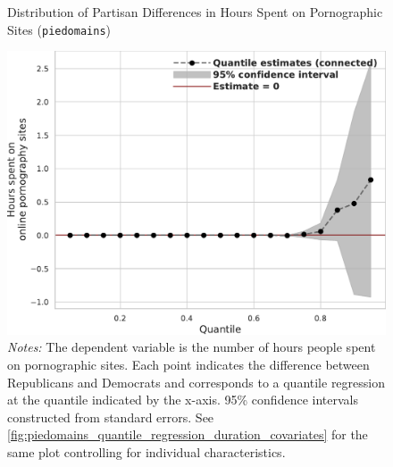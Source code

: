 \documentclass[12pt,twoside]{article}
\begin{document}
\begin{figure}[ht]
	\centering
	\caption{Distribution of Partisan Differences in Hours Spent on Pornographic Sites (\texttt{piedomains})}
	\includegraphics[width=.7\linewidth]{figs/piedomains_quantile_reg_duration_adult.pdf}
	\caption*{\footnotesize \emph{Notes:} 
		The dependent variable is the number of hours people spent on pornographic sites. Each point indicates the difference between Republicans and Democrats and corresponds to a quantile regression at the quantile indicated by the x-axis. 95\% confidence intervals constructed from standard errors. See \cref{fig:piedomains_quantile_regression_duration_covariates} for the same plot controlling for individual characteristics.
	}
	\label{fig:piedomains_quantile_regression_duration}
\end{figure}
\end{document}
